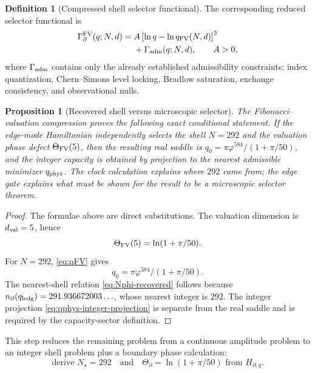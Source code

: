 \documentclass[aps,prd,reprint,nofootinbib,superscriptaddress,floatfix]{revtex4-2}
\numberwithin{equation}{section}
\theoremstyle{definition}
\newtheorem{definition}{Definition}[section]
\theoremstyle{plain}
\newtheorem{proposition}{Proposition}[section]
\begin{document}
\begin{definition}[Compressed shell selector functional]
The corresponding reduced selector functional is
\begin{equation}
\begin{aligned}
\Gamma_{\partial}^{\rm FV}(q;N,d)
={}&
A\left[
\ln q-\ln q_{\rm FV}(N,d)
\right]^2\\
&+\Gamma_{\rm adm}(q;N,d),
\qquad A>0 ,
\end{aligned}
\end{equation}
where \(\Gamma_{\rm adm}\) contains only the already established admissibility constraints: index quantization, Chern--Simons level locking, Bradlow saturation, exchange consistency, and observational nulls.
\end{definition}

\begin{proposition}[Recovered shell versus microscopic selector]
The Fibonacci--valuation compression proves the following exact conditional statement.  If the edge-mode Hamiltonian independently selects the shell \(N=292\) and the valuation phase defect \(\Theta_{\rm FV}(5)\), then the resulting real saddle is \(q_0=\pi\varphi^{584}/(1+\pi/50)\), and the integer capacity is obtained by projection to the nearest admissible minimizer \(q_{\rm phys}\).  The clock calculation explains where \(292\) came from; the edge gate explains what must be shown for the result to be a microscopic selector theorem.
\end{proposition}

\begin{proof}
The formulae above are direct substitutions.  The valuation dimension is \(d_{\rm val}=5\), hence
\[
\Theta_{\rm FV}(5)=\ln(1+\pi/50).
\]
For \(N=292\), \eqref{eq:qFV} gives
\[
q_0=\pi\varphi^{584}/(1+\pi/50).
\]
The nearest-shell relation \eqref{eq:Nphi-recovered} follows because \(n_\partial(q_{\rm ledg})=291.936672003\ldots\), whose nearest integer is \(292\).  The integer projection \eqref{eq:qphys-integer-projection} is separate from the real saddle and is required by the capacity-sector definition.
\end{proof}

This step reduces the remaining problem from a continuous amplitude problem to an integer shell problem plus a boundary phase calculation:
\begin{equation}
\boxed{
\text{derive }N_\star=292
\quad\text{and}\quad
\Theta_\partial=\ln(1+\pi/50)
\text{ from }H_{\partial,q}.
}
\end{equation}
\end{document}
